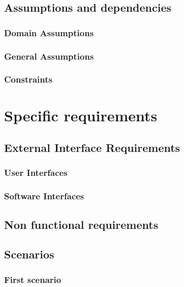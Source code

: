\documentclass[12pt]{article}
\begin{document}
	\subsection{Assumptions and dependencies}
	\subsubsection{Domain Assumptions}
	
	
	\subsubsection{General Assumptions}
	
	\subsubsection{Constraints}
	
	
	\clearpage
	\section{Specific requirements}
	\subsection{External Interface Requirements}
	\subsubsection{User Interfaces}
	
	\subsubsection{Software Interfaces}
	
	\subsection{Non functional requirements}
	
	\clearpage
	\subsection{Scenarios}
	\subsubsection{First scenario}
	
	\FloatBarrier
\end{document}
